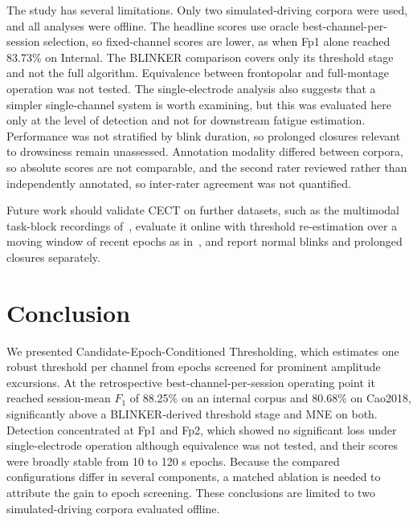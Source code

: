 \documentclass[journal,twoside,web]{ieeecolor}
\begin{document}
The study has several limitations. Only two simulated-driving corpora were used, and all analyses were offline. The headline scores use oracle best-channel-per-session selection, so fixed-channel scores are lower, as when Fp1 alone reached 83.73\% on Internal. The BLINKER comparison covers only its threshold stage and not the full algorithm. Equivalence between frontopolar and full-montage operation was not tested. The single-electrode analysis also suggests that a simpler single-channel system is worth examining, but this was evaluated here only at the level of detection and not for downstream fatigue estimation. Performance was not stratified by blink duration, so prolonged closures relevant to drowsiness remain unassessed. Annotation modality differed between corpora, so absolute scores are not comparable, and the second rater reviewed rather than independently annotated, so inter-rater agreement was not quantified.

Future work should validate CECT on further datasets, such as the multimodal task-block recordings of~\citep{guttmann2025dataset}, evaluate it online with threshold re-estimation over a moving window of recent epochs as in~\citep{chang2016unsupervised}, and report normal blinks and prolonged closures separately.

\section{Conclusion}\label{sec:conclusion}

We presented Candidate-Epoch-Conditioned Thresholding, which estimates one robust threshold per channel from epochs screened for prominent amplitude excursions. At the retrospective best-channel-per-session operating point it reached session-mean $F_1$ of 88.25\% on an internal corpus and 80.68\% on Cao2018, significantly above a BLINKER-derived threshold stage and MNE on both. Detection concentrated at Fp1 and Fp2, which showed no significant loss under single-electrode operation although equivalence was not tested, and their scores were broadly stable from 10 to 120 s epochs. Because the compared configurations differ in several components, a matched ablation is needed to attribute the gain to epoch screening. These conclusions are limited to two simulated-driving corpora evaluated offline.



\end{document}
